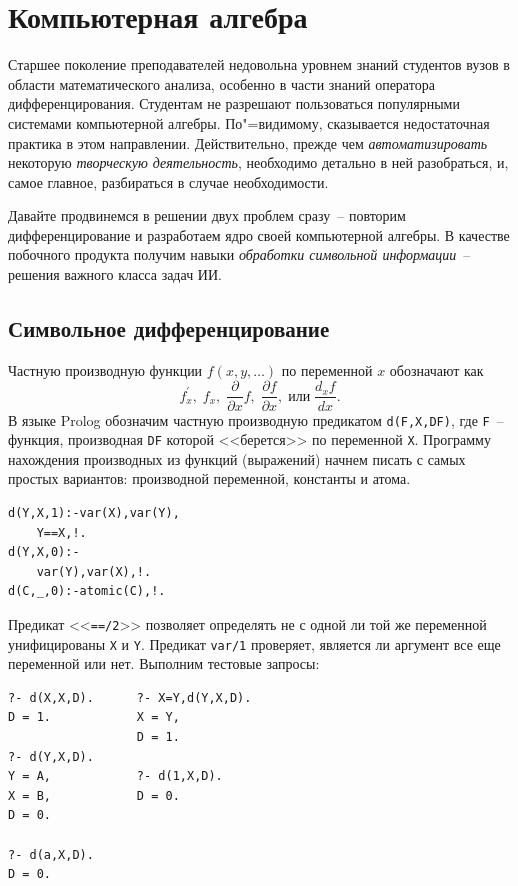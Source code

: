 \documentclass[a4paper,14pt, openany, twoside, draft]{extbook} %
\begin{document}
\chapter{Компьютерная алгебра}
\label{cha:compalgebra}

Старшее поколение преподавателей недовольна уровнем знаний студентов вузов в области математического анализа, особенно в части знаний оператора дифференцирования.  Студентам не разрешают пользоваться популярными системами компьютерной алгебры.  По"=видимому, сказывается недостаточная практика в этом направлении.  Действительно, прежде чем \emph{автоматизировать} некоторую \emph{творческую деятельность}, необходимо детально в ней разобраться, и, самое главное, разбираться в случае необходимости.

Давайте продвинемся в решении двух проблем сразу~-- повторим дифференцирование и разработаем ядро своей компьютерной алгебры.  В качестве побочного продукта получим навыки \emph{обработки символьной информации}~-- решения важного класса задач ИИ.

\section{Символьное дифференцирование}
\label{sec:}


Частную производную функции $f(x,y,\ldots)$ по переменной $x$ обозначают как
$$
f^{\prime}_x,\;f_x,\;\frac{\partial }{\partial x}f,\;\frac{\partial f}{\partial x}, \;\mbox{или}\; \frac{d_x f}{dx}.
$$
В языке Prolog обозначим частную производную предикатом \texttt{d(F,X,DF)}, где \texttt{F}~-- функция, производная \texttt{DF} которой <<берется>> по переменной \texttt{X}.  Программу нахождения производных из функций (выражений) начнем писать с самых простых вариантов: производной переменной, константы и атома.

\begin{verbatim}
d(Y,X,1):-var(X),var(Y),
    Y==X,!.
d(Y,X,0):-
    var(Y),var(X),!.
d(C,_,0):-atomic(C),!.
\end{verbatim}

Предикат <<\texttt{==/2}>> позволяет определять не с одной ли той же переменной унифицированы \texttt{X} и \texttt{Y}.  Предикат \texttt{var/1} проверяет, является ли аргумент все еще переменной или нет.  Выполним тестовые запросы:

\begin{verbatim}
?- d(X,X,D).      ?- X=Y,d(Y,X,D).
D = 1.            X = Y,
                  D = 1.
?- d(Y,X,D).
Y = A,            ?- d(1,X,D).
X = B,            D = 0.
D = 0.

?- d(a,X,D).
D = 0.
\end{verbatim}
\end{document}
